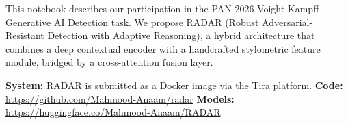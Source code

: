 This notebook describes our participation in the PAN 2026 Voight-Kampff Generative AI Detection task.
We propose RADAR (Robust Adversarial-Resistant Detection with Adaptive Reasoning), a hybrid architecture
that combines a deep contextual encoder with a handcrafted stylometric feature module, bridged by a
cross-attention fusion layer.

\textbf{System:} RADAR is submitted as a Docker image via the Tira platform.
\textbf{Code:} \url{https://github.com/Mahmood-Anaam/radar}
\textbf{Models:} \url{https://huggingface.co/Mahmood-Anaam/RADAR}
